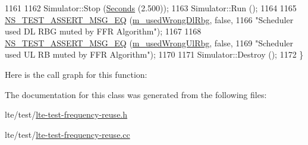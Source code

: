 \begin{DoxyCode}
1161 
1162   Simulator::Stop (\hyperlink{group__timecivil_ga33c34b816f8ff6628e33d5c8e9713b9e}{Seconds} (2.500));
1163   Simulator::Run ();
1164 
1165   \hyperlink{group__testing_ga2a9d78cffb3db8e867c35fff0b698cf5}{NS\_TEST\_ASSERT\_MSG\_EQ} (\hyperlink{classLteFrAreaTestCase_acf1b825c0fc50c57ac990d11ea1529c0}{m\_usedWrongDlRbg}, \textcolor{keyword}{false},
1166                          \textcolor{stringliteral}{"Scheduler used DL RBG muted by FFR Algorithm"});
1167 
1168   \hyperlink{group__testing_ga2a9d78cffb3db8e867c35fff0b698cf5}{NS\_TEST\_ASSERT\_MSG\_EQ} (\hyperlink{classLteFrAreaTestCase_a11e401119f17b78d6693ef29f82b8895}{m\_usedWrongUlRbg}, \textcolor{keyword}{false},
1169                          \textcolor{stringliteral}{"Scheduler used UL RB muted by FFR Algorithm"});
1170 
1171   Simulator::Destroy ();
1172 \}
\end{DoxyCode}


Here is the call graph for this function\+:




The documentation for this class was generated from the following files\+:\begin{DoxyCompactItemize}
\item 
lte/test/\hyperlink{lte-test-frequency-reuse_8h}{lte-\/test-\/frequency-\/reuse.\+h}\item 
lte/test/\hyperlink{lte-test-frequency-reuse_8cc}{lte-\/test-\/frequency-\/reuse.\+cc}\end{DoxyCompactItemize}

